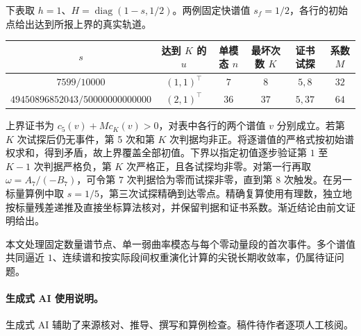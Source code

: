 \documentclass[11pt,a4paper,UTF8,fontset=fandol]{ctexart}
\DeclareMathOperator{\diag}{diag}
\begin{document}
下表取 \(h=1\)、\(H=\diag(1-s,1/2)\)。两例固定快谱值 \(s_f=1/2\)，各行的初始点给出达到所报上界的真实轨道。
\begin{center}
\setlength{\tabcolsep}{4pt}
\begin{tabular}{cccccc}
\toprule
 \(s\) & 达到 \(K\) 的 \(u\) & 单模态 \(n\) & 最坏次数 \(K\) & 证书试探 & 系数 \(M\) \\
\midrule
 \(7599/10000\) & \((1,1)^\top\) & \(7\) & \(8\) & \(5,8\) & \(32\) \\
 \(49450896852043/50000000000000\) & \((2,1)^\top\) & \(36\) & \(37\) & \(5,37\) & \(64\) \\
\bottomrule
\end{tabular}
\end{center}
上界证书为 \(c_5(v)+M c_K(v)>0\)，对表中各行的两个谱值 \(v\) 分别成立。若第 \(K\) 次试探后仍无事件，第 5 次和第 \(K\) 次判据均非正。将逐谱值的严格式按初始谱权求和，得到矛盾，故上界覆盖全部初值。下界以指定初值逐步验证第 \(1\) 至 \(K-1\) 次判据严格负，第 \(K\) 次严格正，且各试探均非零。对第一行再取 \(\omega=A_7/(-B_7)\)，可令第 \(7\) 次判据恰为零而试探非零，直到第 \(8\) 次触发。在另一标量算例中取 \(s=1/5\)，第三次试探精确到达零点。精确复算使用有理数，独立地按标量残差递推及直接坐标算法核对，并保留判据和证书系数。渐近结论由前文证明给出。

本文处理固定数量谱节点、单一弱曲率模态与每个零动量段的首次事件。多个谱值共同逼近 \(1\)、连续谱和按实际段间权重演化计算的尖锐长期收敛率，仍属待证问题。

\paragraph{生成式 AI 使用说明。}
生成式 AI 辅助了来源核对、推导、撰写和算例检查。稿件待作者逐项人工核阅。
\end{document}
